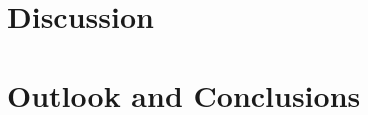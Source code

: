 \documentclass[amt, manuscript]{copernicus}
\begin{document}
\section{Discussion}
\section{Outlook and Conclusions}  %













\appendix
\section{}    %

\subsection{}     %


\noappendix       %


\end{document}
